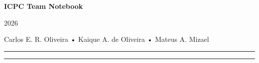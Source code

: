 \documentclass[a4paper, 10pt]{article}
\begin{document}
\begin{center}
    \vspace{0.2cm}

    {\LARGE\bfseries ICPC Team Notebook}

    \vspace{0.3cm}

    {\large 2026}

    \vspace{0.3cm}

    Carlos E. R. Oliveira
    \quad • \quad
    Kaique A. de Oliveira
    \quad • \quad
    Mateus A. Mizael
\end{center}

\vspace{0.2cm}

\noindent\rule{\textwidth}{0.3pt}

\vspace{0.2cm}

\tableofcontents

\vspace{0.2cm}

\noindent\rule{\textwidth}{0.3pt}








\end{document}
